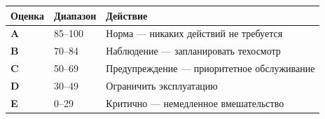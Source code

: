 \documentclass[a4paper,11pt]{article}
\begin{document}
\vspace{6pt}
\begin{tabularx}{\textwidth}{C{1.8cm} C{2.2cm} L{9cm}}
\toprule
{}
\color{white}\textbf{Оценка} &
\color{white}\textbf{Диапазон} &
\color{white}\textbf{Действие} \\
\midrule
{} \textbf{A} & 85–100 & Норма — никаких действий не требуется \\
 \textbf{B} & 70–84  & Наблюдение — запланировать техосмотр \\
 \textbf{C} & 50–69  & Предупреждение — приоритетное обслуживание \\
 \textbf{D} & 30–49  & Ограничить эксплуатацию \\
 \textbf{E} & 0–29   & Критично — немедленное вмешательство \\
\bottomrule
\end{tabularx}
\end{document}
